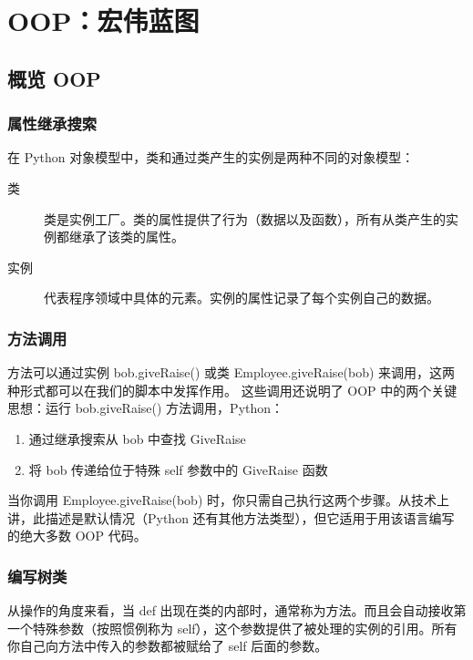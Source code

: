 \chapter{OOP：宏伟蓝图\label{ch26}}
\section{概览 OOP}
\subsection{属性继承搜索}
在 Python 对象模型中，类和通过类产生的实例是两种不同的对象模型：
\begin{description}
    \item[类]类是实例工厂。类的属性提供了行为（数据以及函数），所有从类产生的实例都继承了该类的属性。
    \item[实例]代表程序领域中具体的元素。实例的属性记录了每个实例自己的数据。
\end{description}
\subsection{方法调用}
方法可以通过实例 bob.giveRaise() 或类 Employee.giveRaise(bob) 来调用，这两种形式都可以在我们的脚本中发挥作用。 这些调用还说明了 OOP 中的两个关键思想：运行 bob.giveRaise() 方法调用，Python：
\begin{enumerate}
    \item 通过继承搜索从 bob 中查找 GiveRaise
    \item 将 bob 传递给位于特殊 self 参数中的 GiveRaise 函数
\end{enumerate}

当你调用 Employee.giveRaise(bob) 时，你只需自己执行这两个步骤。从技术上讲，此描述是默认情况（Python 还有其他方法类型），但它适用于用该语言编写的绝大多数 OOP 代码。
\subsection{编写树类}
从操作的角度来看，当 def 出现在类的内部时，通常称为方法。而且会自动接收第一个特殊参数（按照惯例称为 self），这个参数提供了被处理的实例的引用。所有你自己向方法中传入的参数都被赋给了 self 后面的参数。